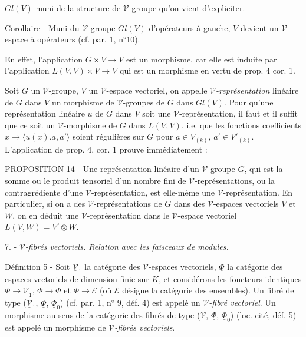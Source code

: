 $Gl(V)$ muni de la structure de $\mathcal{V}$-groupe qu'on vient d'expliciter.

Corollaire - Muni du $\mathcal{V}$-groupe $Gl(V)$ d'opérateurs à gauche, $V$ devient un $\mathcal{V}$-espace à opérateurs (cf. par. 1, n°10).

En effet, l'application $G \times V \to V$ est un morphisme, car elle est induite par l'application $L(V,V) \times V \to V$ qui est un morphisme en vertu de prop. 4 cor. 1.

Soit $G$ un $\mathcal{V}$-groupe, $V$ un $\mathcal{V}$-espace vectoriel, on appelle \emph{$\mathcal{V}$-représentation} linéaire de $G$ dans $V$ un morphisme de $\mathcal{V}$-groupes de $G$ dans $Gl(V)$. Pour qu'une représentation linéaire $u$ de $G$ dans $V$ soit une $\mathcal{V}$-représentation, il faut et il suffit que ce soit un $\mathcal{V}$-morphisme de $G$ dans $L(V,V)$, i.e. que les fonctions coefficients $x \to \langle u(x).a, a' \rangle$ soient régulières sur $G$ pour $a \in V_{(k)}$, $a' \in V'_{(k)}$. L'application de prop. 4, cor. 1 prouve immédiatement :

PROPOSITION 14 - Une représentation linéaire d'un $\mathcal{V}$-groupe $G$, qui est la somme ou le produit tensoriel d'un nombre fini de $\mathcal{V}$-représentations, ou la contragrédiente d'une $\mathcal{V}$-représentation, est elle-même une $\mathcal{V}$-représentation. En particulier, si on a des $\mathcal{V}$-représentations de $G$ dans des $\mathcal{V}$-espaces vectoriels $V$ et $W$, on en déduit une $\mathcal{V}$-représentation dans le $\mathcal{V}$-espace vectoriel $L(V,W) = V' \otimes W$.

7. - \emph{$\mathcal{V}$-fibrés vectoriels. Relation avec les faisceaux de modules.}

Définition 5 - Soit $\underline{\mathcal{V}}_1$ la catégorie des $\mathcal{V}$-espaces vectoriels, $\underline{\Phi}$ la catégorie des espaces vectoriels de dimension finie sur $K$, et considérons les foncteurs identiques $\underline{\Phi} \to \underline{\mathcal{V}}_1$, $\underline{\Phi} \to \underline{\Phi}$ et $\underline{\Phi} \to \underline{\mathcal{E}}$ (où $\underline{\mathcal{E}}$ désigne la catégorie des ensembles). Un fibré de type ($\underline{\mathcal{V}}_1$, $\underline{\Phi}$, $\underline{\Phi}_0$) (cf. par. 1, n° 9, déf. 4) est appelé un \emph{$\mathcal{V}$-fibré vectoriel}. Un morphisme au sens de la catégorie des fibrés de type ($\mathcal{V}$, $\underline{\Phi}$, $\underline{\Phi}_0$) (loc. cité, déf. 5) est appelé un morphisme de \emph{$\mathcal{V}$-fibrés vectoriels}.

